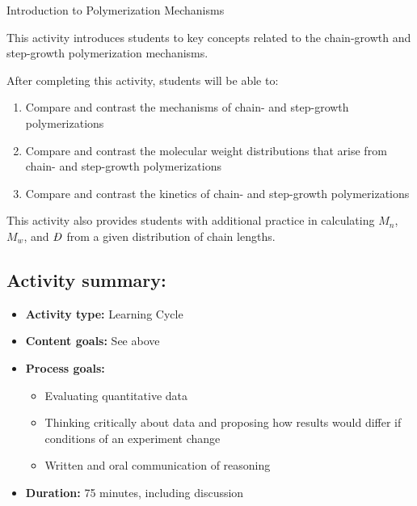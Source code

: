 %
%
%
%

\renewcommand{\figpath}{content/intro/chain-and-step/figs}
\renewcommand{\labelbase}{chain-and-step}

\begin{activity}{Introduction to Polymerization Mechanisms}
\begin{instructornotes}

	This activity introduces students to key concepts related to the chain-growth and step-growth polymerization mechanisms.
	
	After completing this activity, students will be able to:
			\begin{enumerate}
				\item Compare and contrast the mechanisms of chain- and step-growth polymerizations
				\item Compare and contrast the molecular weight distributions that arise from chain- and step-growth polymerizations
				\item Compare and contrast the kinetics of chain- and step-growth polymerizations
			\end{enumerate}
			
	This activity also provides students with additional practice in calculating $M_n$, $M_w$, and $\PDImath$ from a given distribution of chain lengths.
			
	\subsection*{Activity summary:}
	\begin{itemize}
		\item \textbf{Activity type:} Learning Cycle
		\item \textbf{Content goals:} See above
		\item \textbf{Process goals:} %
			\begin{itemize}
				\item Evaluating quantitative data
				\item Thinking critically about data and proposing how results would differ if conditions of an experiment change
				\item Written and oral communication of reasoning
			\end{itemize}
		\item \textbf{Duration:} 75 minutes, including discussion 
		

\end{itemize}
\end{instructornotes}
\end{activity}

